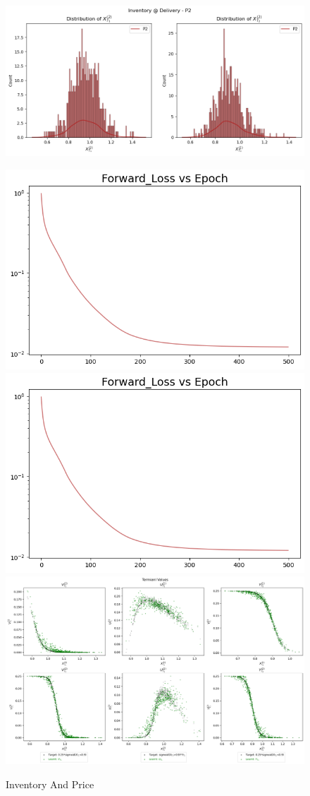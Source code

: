 \documentclass{article}
\begin{document}
{\begin{figure}[ht]
    \includegraphics{FinalReports/Illustration_Diagrams/joint-2A2P-Sigmoid-ResExamples/InvPreDeli_P2.png}\\
    \caption{Inventory And Price}\label{fig:enter-label}
    \includegraphics{FinalReports/Illustration_Diagrams/joint-2A2P-Sigmoid-ResExamples/Loss.png}\\
    \includegraphics[width=0.5\linewidth,height=9\baselineskip]{FinalReports/Illustration_Diagrams/joint-2A2P-Sigmoid-ResExamples/Loss.png}\\
    \includegraphics[width=0.5\linewidth,height=9\baselineskip]{FinalReports/Illustration_Diagrams/joint-2A2P-Sigmoid-ResExamples/sigmoid_target.png}
\end{figure}



}
\end{document}
